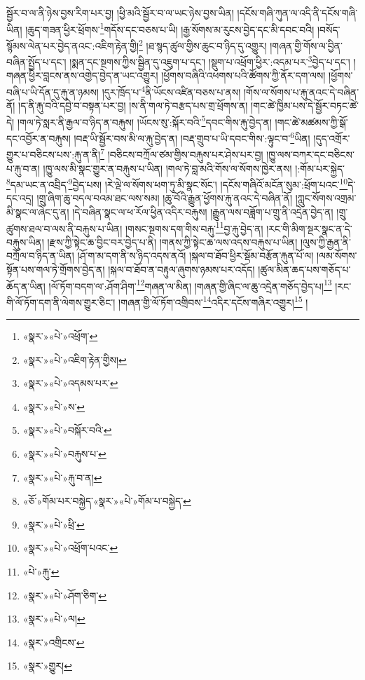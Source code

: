 སྦྱོར་བ་ལ་ནི་ཉེས་བྱས་རིག་པར་བྱ། །ཕྱི་མའི་སྦྱོར་བ་ལ་ཡང་ཉེས་བྱས་ཡིན། །དངོས་གཞི་ཀུན་ལ་འདི་ནི་དངོས་གཞི་ཡིན། །ཆུད་གཟན་ཕྱིར་ཕྲོགས་\footnote{«སྣར་»«པེ་»འཕྲོག་}གདོས་དང་བཅས་པ་ཡི། །རྒྱ་སོགས་མ་རུངས་བྱེད་དང་མི་དབང་བའི། །བསོད་སྙོམས་ལེན་པར་བྱེད་ནའང་:འཇིག་རྟེན་གྱི།\footnote{«སྣར་»«པེ་»འཇིག་རྟེན་གྱིས།} །ཐ་སྙད་ཚུལ་གྱིས་ཆུང་བ་ཉིད་དུ་འགྱུར། །གཞན་གྱི་གོས་ལ་བྱིན་བཞིན་སྤྱོད་པ་དང་། །སྨན་དང་སྔགས་ཀྱིས་སྦྱིན་དུ་འཇུག་པ་དང་། །སྡུག་པ་འཕྲོག་ཕྱིར་:འདམ་པར་\footnote{«སྣར་»«པེ་»འདམས་པར་}བྱེད་པ་དང་། །གཞན་ཕྱིར་བླངས་ནས་འགྱེད་བྱེད་ན་ཡང་འགྱུར། །ཕྱོགས་བཞིའི་འཕགས་པའི་ཚོགས་ཀྱི་ནོར་དག་ལས། །ཕྱོགས་བཞི་པ་ཡི་དོན་དུ་རྐུ་ན་ཉམས། །དུར་ཁྲོད་པ་\footnote{«སྣར་»«པེ་»ས་}ནི་ཡོངས་འཛིན་བཅས་པ་ནས། །གོས་ལ་སོགས་པ་རྐུ་ནའང་དེ་བཞིན་ནོ། །ད་ནི་རྐུ་བའི་དབྱེ་བ་བསྟན་པར་བྱ། །ས་ནི་གལ་ཏེ་བརྩད་པས་གྲ་ཕྲོགས་ན། །གང་ཚེ་ཁྱིམ་པས་དེ་སྦྱོར་བཏང་ཚེ་དེ། །གལ་ཏེ་སླར་ནི་རྒྱལ་བ་ཉིད་ན་བརྐུས། །ཡོངས་སུ་:སྐོར་བའི་\footnote{«སྣར་»«པེ་»བསྐོར་བའི་}དབང་གིས་རྐུ་བྱེད་ན། །གང་ཚེ་མཚམས་ཀྱི་སྒོ་དང་འབྱོར་ན་བརྐུས། །བརྡ་ཡི་སྦྱོར་བས་མི་ལ་རྐུ་བྱེད་ན། །བརྡ་གྲུབ་པ་ཡི་དབང་གིས་:ལྟུང་བ་\footnote{«སྣར་»«པེ་»བརྐུས་པ་}ཡིན། །དུད་འགྲོར་གྱུར་པ་བཅིངས་པས་:རྐུ་ན་ནི།\footnote{«སྣར་»«པེ་»རྐུ་བ་ན།} །བཅིངས་བཀྲོལ་ཙམ་གྱིས་བརྐུས་པར་ཤེས་པར་བྱ། །ཁྱུ་ལས་བཀར་དང་བཅིངས་པ་རྐུ་བ་ན། །ཁྱུ་ལས་མི་སྣང་གྱུར་ན་བརྐུས་པ་ཡིན། །གལ་ཏེ་བླ་མའི་གོས་ལ་སོགས་ཁྱེར་ནས། །:གོམ་པར་སྐྱེད་\footnote{«ཅོ་»གོམ་པར་བསྐྱེད་«སྣར་»«པེ་»གོམ་པ་བསྐྱེད་}དམ་ཡང་ན་འབྲིད་\footnote{«སྣར་»«པེ་»ཕྲི་}བྱེད་པས། །རེ་ལྡེ་ལ་སོགས་ཕག་ཏུ་མི་སྣང་སོང་། །དངོས་གཞིའོ་མངོན་སུམ་:ཕྲོག་པའང་\footnote{«སྣར་»«པེ་»འཕྲོག་པའང་}དེ་དང་འདྲ། །གྲུ་ཞིག་ཆུ་བདལ་བའམ་ཐང་ལས་སམ། །ཆུ་བོའི་རྒྱུན་ཕྱོགས་རྐུ་ནའང་དེ་བཞིན་ནོ། །ཀླུང་སོགས་འགྲམ་མི་སྣང་ལ་ཞེང་དུ་ན། །དེ་བཞིན་སྣང་ལ་ཕ་རོལ་ཕྱིན་འདིར་བརྐུས། །རྒྱུན་ལས་བཟློག་པ་གྲུ་ནི་འདྲེན་བྱེད་ན། །གྲུ་ཚུགས་ཐལ་བ་ལས་ནི་བརྐུས་པ་ཡིན། །གསང་སྔགས་དག་གིས་བརྐུ་\footnote{«པེ་»རྐུ་}བྱ་རྐུ་བྱེད་ན། །རང་གི་མིག་སྔར་སྣང་ན་དེ་བརྐུས་ཡིན། །རྫས་ཀྱི་སྟེང་ཆ་བྱིང་བར་བྱེད་པ་ནི། །གནས་ཀྱི་སྟེང་ཆ་ལས་འདས་བརྐུས་པ་ཡིན། །ལུས་ཀྱི་རྒྱན་ནི་བཀྲོལ་བ་ཉིད་ན་ཡིན། །ཤོ་ག་མ་དག་ནི་ས་ཉིད་འདས་ནའོ། །སྐལ་བ་ཐོབ་ཕྱིར་སྡོམ་བརྩོན་རྐུན་པོ་ལ། །ལམ་སོགས་སྟོན་པས་གལ་ཏེ་གྲོགས་བྱེད་ན། །སྐལ་བ་ཐོབ་ན་བརྟུལ་ཞུགས་ཉམས་པར་འདོད། །ཚུལ་མིན་ཆད་པས་གཅོད་པ་ཆོད་ན་ཡིན། །ལོ་ཏོག་བདག་ལ་:ཤོག་ཤིག་\footnote{«སྣར་»«པེ་»ཤོག་ཅིག་}གཞན་ལ་མིན། །གཞན་གྱི་ཞིང་ལ་ཆུ་འདྲེན་གཅོད་བྱེད་པ།\footnote{«སྣར་»«པེ་»ལ།} །རང་གི་ལོ་ཏོག་དག་ནི་ལེགས་གྱུར་ཅིང་། །གཞན་གྱི་ལོ་ཏོག་འགྲིབས་\footnote{«སྣར་»འགྲིངས་}འདིར་དངོས་གཞིར་འགྱུར།\footnote{«སྣར་»གྱུར།} །
